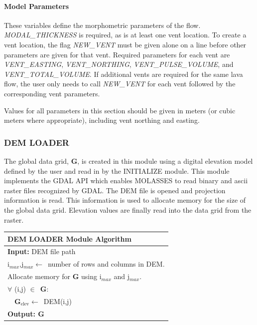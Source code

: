 \documentclass[12pt,letter]{article}
\begin{document}
			\paragraph{Model Parameters} These variables define the morphometric parameters of the flow. \textit{MODAL\_THICKNESS} is required, as is at least one vent location. To create a vent location, the flag \textit{NEW\_VENT} must be given alone on a line before other parameters are given for that vent. Required parameters for each vent are \textit{VENT\_EASTING}, \textit{VENT\_NORTHING}, \textit{VENT\_PULSE\_VOLUME}, and \textit{VENT\_TOTAL\_VOLUME}. If additional vents are required for the same lava flow, the user only needs to call \textit{NEW\_VENT} for each vent followed by the corresponding vent parameters.
				
				Values for all parameters in this section should be given in meters (or cubic meters where appropriate), including vent northing and easting.

		\subsubsection{DEM LOADER}
			The global data grid, \textbf{G}, is created in this module using a digital elevation model defined by the user and read in by the INITIALIZE module. This module implements the GDAL API which enables MOLASSES to read binary and ascii raster files recognized by GDAL. The DEM file is opened and projection information is read. This information is used to allocate memory for the size of the global data grid. Elevation values are finally read into the data grid from the raster.
			
			\begin{center}
				\begin{tabular}{l}
					\toprule
					\textbf{DEM LOADER Module Algorithm}\\
					\midrule
					\textbf{Input:} DEM file path\\
					i$_{max}$,j$_{max}\leftarrow$~number of rows and columns in DEM.\\
					Allocate memory for \textbf{G} using i$_{max}$ and j$_{max}$.\\
					$\forall$ (i,j) $\in$~\textbf{G}:\\
					~~\textbf{G}$_{\mathrm{elev}}\leftarrow$~DEM(i,j)\\
					
					\textbf{Output: G}\\
					\bottomrule
				\end{tabular}
			\end{center}
		
\end{document}
